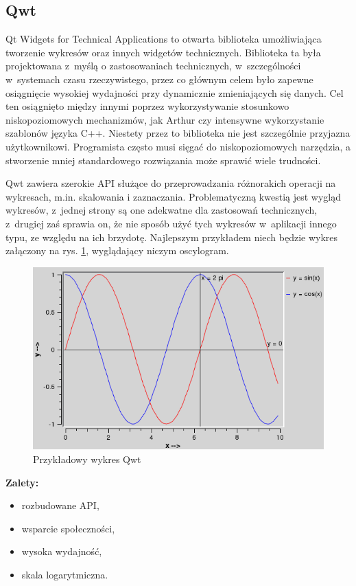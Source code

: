 \documentclass[11pt,twoside,a4paper,final]{llncs}
\begin{document}
\subsection{Qwt}
Qt Widgets for Technical Applications to otwarta biblioteka umożliwiająca tworzenie wykresów oraz innych widgetów technicznych. Biblioteka ta była projektowana z~myślą o zastosowaniach technicznych, w~szczególności w~systemach czasu rzeczywistego, przez co głównym celem było zapewne osiągnięcie wysokiej wydajności przy dynamicznie zmieniających się danych. Cel ten osiągnięto między innymi poprzez wykorzystywanie stosunkowo niskopoziomowych mechanizmów, jak Arthur czy intensywne wykorzystanie szablonów języka C++. Niestety przez to biblioteka nie jest szczególnie przyjazna użytkownikowi. Programista często musi sięgać do niskopoziomowych narzędzia, a stworzenie mniej standardowego rozwiązania może sprawić wiele trudności.\newline

Qwt zawiera szerokie API służące do przeprowadzania różnorakich operacji na wykresach, m.in. skalowania i zaznaczania. Problematyczną kwestią jest wygląd wykresów, z~jednej strony są one adekwatne dla zastosowań technicznych, z~drugiej zaś sprawia on, że nie sposób użyć tych wykresów w~aplikacji innego typu, ze względu na ich brzydotę. Najlepszym przykładem niech będzie wykres załączony na rys. \ref{rys:wykres:sinus}, wyglądający niczym oscylogram.
\begin{figure}
\centering
\caption{Przykładowy wykres Qwt}\label{rys:wykres:sinus}
\includegraphics[scale=0.4]{sinus.png}
\end{figure}

\textbf{Zalety:}
\begin{itemize}
\item{rozbudowane API,}
\item{wsparcie społeczności,}
\item{wysoka wydajność,}
\item{skala logarytmiczna.}\newline
\end{itemize}
\end{document}
